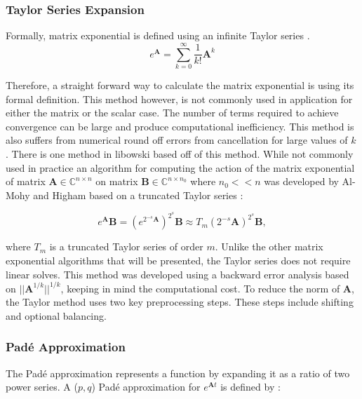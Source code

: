 \subsubsection{Taylor Series Expansion}
Formally,  matrix exponential is defined using an infinite Taylor series \cite{exokit} \cite{moler2003} \cite{pusa2010}. 
\begin{equation}
    e^{\boldsymbol{A}} = \sum_{k = 0}^{\infty}\frac{1}{k!}\boldsymbol{A}^{k}
    \label{eq:power_series_exp}
\end{equation}

\noindent Therefore, a straight forward way to calculate the matrix exponential is using its formal definition. This method however, is not commonly used in application for either the matrix or the scalar case. The number of terms required to achieve convergence can be large and produce computational inefficiency. This method is also suffers from numerical round off errors from cancellation for large values of $k$ \cite{moler2003}. There is one method in libowski based off of this method. While not commonly used in practice an algorithm for computing the action of the matrix exponential of matrix $\boldsymbol{A} \in \mathbb{C}^{n\times n}$ on matrix $\boldsymbol{B} \in \mathbb{C}^{n\times n_{0}}$ where $n_{0} << n$ was developed by Al-Mohy and Higham based on a truncated Taylor series \cite{higham2011}:

\begin{equation}
    e^{\boldsymbol{A}}\boldsymbol{B} = (e^{2^{-s}\boldsymbol{A}})^{2^{s}}\boldsymbol{B} \approx T_{m}(2^{-s}\boldsymbol{A})^{2^{s}}\boldsymbol{B},
\end{equation}

\noindent where $T_{m}$ is a truncated Taylor series of order $m$. Unlike the other matrix exponential algorithms that will be presented, the Taylor series does not require linear solves. This method was developed using a backward error analysis based on $||\boldsymbol{A}^{1/k}||^{1/k}$, keeping in mind the computational cost. To reduce the norm of $\boldsymbol{A}$, the Taylor method uses two key preprocessing steps. These steps include shifting and optional balancing. 


\subsubsection{Pad\'e Approximation}
The Pad\'e approximation represents a function by expanding it as a ratio of two power series. A ($p,q$) Pad\'e approximation for $e^{\boldsymbol{A}t}$ is defined by \cite{moler2003}:

